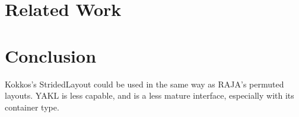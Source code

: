 \section{Related Work}

\section{Conclusion}


Kokkos's StridedLayout could be used in the same way as RAJA's permuted layouts. 
YAKL is less capable, and is a less mature interface, especially with its container type.






